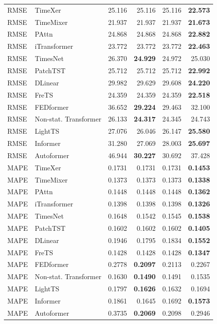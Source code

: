 \begin{longtable}{llrrrr}
\midrule
RMSE & TimeXer & 25.116 & 25.116 & 25.116 & \textbf{22.573} \\
RMSE & TimeMixer & 21.937 & 21.937 & 21.937 & \textbf{21.673} \\
RMSE & PAttn & 24.868 & 24.868 & 24.868 & \textbf{22.882} \\
RMSE & iTransformer & 23.772 & 23.772 & 23.772 & \textbf{22.463} \\
RMSE & TimesNet & 26.370 & \textbf{24.929} & 24.972 & 25.030 \\
RMSE & PatchTST & 25.712 & 25.712 & 25.712 & \textbf{22.992} \\
RMSE & DLinear & 29.982 & 29.629 & 29.608 & \textbf{24.220} \\
RMSE & FreTS & 24.359 & 24.359 & 24.359 & \textbf{22.518} \\
RMSE & FEDformer & 36.652 & \textbf{29.224} & 29.463 & 32.100 \\
RMSE & Non-stat. Transformer & 26.133 & \textbf{24.317} & 24.345 & 24.743 \\
RMSE & LightTS & 27.076 & 26.046 & 26.147 & \textbf{25.580} \\
RMSE & Informer & 31.280 & 27.069 & 28.003 & \textbf{25.697} \\
RMSE & Autoformer & 46.944 & \textbf{30.227} & 30.692 & 37.428 \\
\midrule
MAPE & TimeXer & 0.1731 & 0.1731 & 0.1731 & \textbf{0.1453} \\
MAPE & TimeMixer & 0.1373 & 0.1373 & 0.1373 & \textbf{0.1338} \\
MAPE & PAttn & 0.1448 & 0.1448 & 0.1448 & \textbf{0.1362} \\
MAPE & iTransformer & 0.1398 & 0.1398 & 0.1398 & \textbf{0.1326} \\
MAPE & TimesNet & 0.1648 & 0.1542 & 0.1545 & \textbf{0.1538} \\
MAPE & PatchTST & 0.1602 & 0.1602 & 0.1602 & \textbf{0.1405} \\
MAPE & DLinear & 0.1946 & 0.1795 & 0.1834 & \textbf{0.1552} \\
MAPE & FreTS & 0.1428 & 0.1428 & 0.1428 & \textbf{0.1347} \\
MAPE & FEDformer & 0.2778 & \textbf{0.2097} & 0.2113 & 0.2267 \\
MAPE & Non-stat. Transformer & 0.1630 & \textbf{0.1490} & 0.1491 & 0.1535 \\
MAPE & LightTS & 0.1797 & \textbf{0.1626} & 0.1632 & 0.1694 \\
MAPE & Informer & 0.1861 & 0.1645 & 0.1692 & \textbf{0.1573} \\
MAPE & Autoformer & 0.3735 & \textbf{0.2069} & 0.2098 & 0.2946 \\
\end{longtable}
\endgroup

